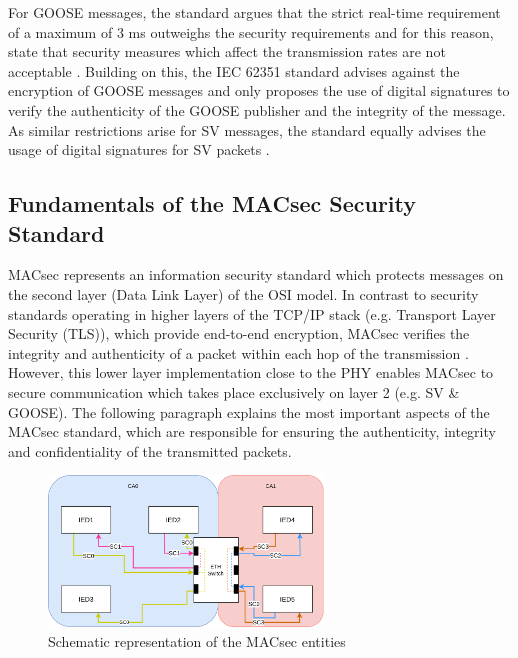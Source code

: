 \documentclass[conference, onecolumn, a4paper]{IEEEtran}
\begin{document}
\smallskip
For GOOSE messages, the standard argues that the strict real-time requirement of a maximum of 3 ms \cite{GOOSE_confidentiality_integrity:2020} outweighs 
the security requirements and for this reason, state that security measures which affect the transmission rates are not acceptable \cite{PoisonedGOOSE:2014}. 
Building on this, the IEC 62351 standard advises against the encryption of GOOSE messages and only proposes the use of digital signatures to verify the 
authenticity of the GOOSE publisher and the integrity of the message. As similar restrictions arise for SV messages, the standard equally advises the 
usage of digital signatures for SV packets \cite{Review_IEC62351:2019}. 

\subsection{Fundamentals of the MACsec Security Standard}
\noindent MACsec represents an information security standard which protects messages on the second layer (Data Link Layer) of the OSI model. In contrast 
to security standards operating in higher layers of the TCP/IP stack (e.g. Transport Layer Security (TLS)), which provide end-to-end encryption, MACsec 
verifies the integrity and authenticity of a packet within each hop of the transmission \cite{Cybersecurity_Substation:2016}. However, this lower layer 
implementation close to the PHY enables MACsec to secure communication which takes place exclusively on layer 2 (e.g. SV \& GOOSE). The 
following paragraph explains the most important aspects of the MACsec standard, which are responsible for ensuring the authenticity, integrity and 
confidentiality of the transmitted packets.

\begin{figure}[h]
    \centering
    \includegraphics[width=0.65\textwidth]{images/MACsec_Entities_Diagram.png}
    \caption{Schematic representation of the MACsec entities \cite{IEEE-802-1AE:2018}}
    \label{image:MACsecEntities}
\end{figure}
\end{document}
